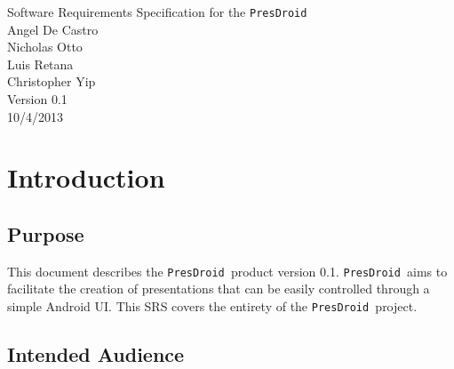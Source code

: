 \documentclass{article}
\newcommand{\pd}{\texttt{PresDroid }}
\begin{document}
\Huge
\begin{center}
    Software Requirements Specification for the \pd\\
    \vspace{3cm}
    \Large
    Angel De Castro\\
    Nicholas Otto\\
    Luis Retana\\
    Christopher Yip\\
    \vspace{2cm}
    Version 0.1\\
    10/4/2013
\end{center}

\normalsize

\newpage
\tableofcontents

\newpage
\section{Introduction}
\subsection{Purpose}

This document describes the \pd product version 0.1.
\pd aims to facilitate the creation of presentations that can be easily controlled through a simple Android UI. 
This SRS covers the entirety of the \pd project.



\subsection{Intended Audience} %
\end{document}
